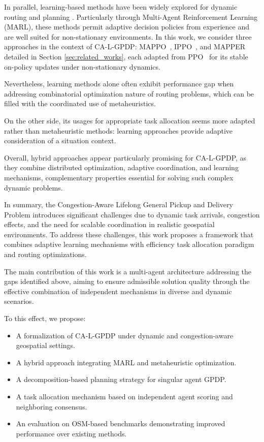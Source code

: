 \documentclass[sigconf]{acmart}
\begin{document}
In parallel, learning-based methods have been widely explored for dynamic routing and planning \cite{nazari2018}. Particularly through Multi-Agent Reinforcement Learning (MARL), these methods permit adaptive decision policies from experience \cite{sutton1998} and are well suited for non-stationary environments. In this work, we consider three approaches in the context of CA-L-GPDP: MAPPO~\cite{yu2022}, IPPO~\cite{dewitt2020}, and MAPPER~\cite{liu2020} detailed in Section \ref{sec:related_works}, each adapted from PPO~\cite{schulman2017} for its stable on-policy updates under non-stationary dynamics.

Nevertheless, learning methods alone often exhibit performance gap when addressing combinatorial optimization nature of routing problems, which can be filled with the coordinated use of metaheuristics.

On the other side, its usages for appropriate task allocation seems more adapted rather than metaheuristic methods: learning approaches provide adaptive consideration of a situation context.

Overall, hybrid approaches appear particularly promising for CA-L-GPDP, as they combine distributed optimization, adaptive coordination, and learning mechanisms, complementary properties essential for solving such complex dynamic problems.

In summary, the Congestion-Aware Lifelong General Pickup and Delivery Problem introduces significant challenges due to dynamic task arrivals, congestion effects, and the need for scalable coordination in realistic geospatial environments. To address these challenges, this work proposes a framework that combines adaptive learning mechanisms with efficiency task allocation paradigm and routing optimizations.

The main contribution of this work is a multi-agent architecture addressing the gaps identified above, aiming to ensure admissible solution quality through the effective combination of independent mechanisms in diverse and dynamic scenarios.

To this effect, we propose:
\begin{itemize}
	\item A formalization of CA-L-GPDP under dynamic and congestion-aware geospatial settings.
    \item A hybrid approach integrating MARL and metaheuristic optimization.
	\item A decomposition-based planning strategy for singular agent GPDP.
	\item A task allocation mechanism based on independent agent scoring and neighboring consensus.
	\item An evaluation on OSM-based \cite{haklay2008} benchmarks demonstrating improved performance over existing methods.
\end{itemize}
\end{document}
